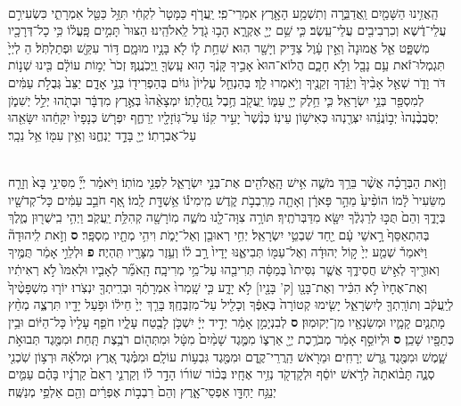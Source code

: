 \documentclass[twoside, openany, parskip=half, 11pt]{book}
\begin{document}
\begin{footnotesize}
\begin{multicols}{2}
\\
 		הַֽאֲזִ֥ינוּ הַשָּׁמַ֖יִם וַֽאֲדַבֵּ֑רָה 		וְתִשְׁמַ֥ע הָאָ֖רֶץ אִמְרֵי־פִֽי׃ 
			יַֽעֲרֹ֤ף כַּמָּטָר֙ לִקְחִ֔י 			תִּזַּ֥ל כַּטַּ֖ל אִמְרָתִ֑י 
			כִּשְׂעִירִ֣ם עֲלֵי־דֶ֔שֶׁא 			וְכִרְבִיבִ֖ים עֲלֵי־עֵֽשֶׂב׃ 
			כִּ֛י שֵׁ֥ם יְיָ֖ אֶקְרָ֑א 			הָב֥וּ גֹ֖דֶל לֵֽאלֹהֵֽינוּ׃
			 הַצּוּר֙ תָּמִ֣ים פָּֽעֳל֔וֹ 			כִּ֥י כָל־דְּרָכָ֖יו מִשְׁפָּ֑ט 
			אֵ֤ל אֱמוּנָה֙ וְאֵ֣ין עָ֔וֶל 			צַדִּ֥יק וְיָשָׁ֖ר הֽוּא׃ 
			שִׁחֵ֥ת ל֛וֹ לֹ֖א בָּנָ֣יו מוּמָ֑ם 		דּ֥וֹר עִקֵּ֖שׁ וּפְתַלְתֹּֽל׃ 
			הַ לְיְיָ֙ תִּגְמְלוּ־זֹ֔את 		עַ֥ם נָבָ֖ל וְלֹ֣א חָכָ֑ם 
			הֲלוֹא־הוּא֙ אָבִ֣יךָ קָּנֶ֔ךָ 		ה֥וּא עָֽשְׂךָ֖ וַֽיְכֹֽנֲנֶֽךָ׃ 
	 		 זְכֹר֙ יְמ֣וֹת עוֹלָ֔ם 			בִּ֖ינוּ שְׁנ֣וֹת דֹּר וָדֹ֑ר 
			שְׁאַ֤ל אָבִ֨יךָ֙ וְיַגֵּ֔דְךָ 			זְקֵנֶ֖יךָ וְיֹ֥אמְרוּ לָֽךְ׃ 
			בְּהַנְחֵ֤ל עֶלְיוֹן֙ גּוֹיִ֔ם 			בְּהַפְרִיד֖וֹ בְּנֵ֣י אָדָ֑ם 
			יַצֵּב֙ גְּבֻלֹ֣ת עַמִּ֔ים 			לְמִסְפַּ֖ר בְּנֵ֥י יִשְׂרָאֵֽל׃ 
			כִּ֛י חֵ֥לֶק יְיָ֖ עַמּ֑וֹ 			יַֽעֲקֹ֖ב חֶ֥בֶל נַֽחֲלָתֽוֹ׃ 
			יִמְצָאֵ֨הוּ֙ בְּאֶ֣רֶץ מִדְבָּ֔ר 		וּבְתֹ֖הוּ יְלֵ֣ל יְשִׁמֹ֑ן 
			יְסֹֽבֲבֶ֨נְהוּ֙ יְב֣וֹנֲנֵ֔הוּ 			יִצְּרֶ֖נְהוּ כְּאִישׁ֥וֹן עֵינֽוֹ׃ 
			כְּנֶ֨שֶׁר֙ יָעִ֣יר קִנּ֔וֹ 			עַל־גּֽוֹזָלָ֖יו יְרַחֶ֑ף 
			יִפְרֹ֤שׂ כְּנָפָיו֙ יִקָּחֵ֔הוּ 			יִשָּׂאֵ֖הוּ עַל־אֶבְרָתֽוֹ׃ 
			יְיָ֖ בָּדָ֣ד יַנְחֶ֑נּוּ 			וְאֵ֥ין עִמּ֖וֹ אֵ֥ל נֵכָֽר׃
			
\\
וְזֹ֣את הַבְּרָכָ֗ה אֲשֶׁ֨ר בֵּרַ֥ךְ מֹשֶׁ֛ה אִ֥ישׁ הָֽאֱלֹהִ֖ים אֶת־בְּנֵ֣י יִשְׂרָאֵ֑ל לִפְנֵ֖י מוֹתֽוֹ׃ וַיֹּאמַ֗ר יְיָ֞ מִסִּינַ֥י בָּא֙ וְזָרַ֤ח מִשֵּׂעִיר֙ לָ֔מוֹ הוֹפִ֨יעַ֙ מֵהַ֣ר פָּארָ֔ן וְאָתָ֖ה מֵרִֽבְבֹ֣ת קֹ֑דֶשׁ מִֽימִינ֕וֹ אֵ֥שְׁדָּ֖ת לָֽמוֹ׃ אַ֚ף חֹבֵ֣ב עַמִּ֔ים כָּל־קְדֹשָׁ֖יו בְּיָדֶ֑ךָ וְהֵם֙ תֻּכּ֣וּ לְרַגְלֶ֔ךָ יִשָּׂ֖א מִדַּבְּרֹתֶֽיךָ׃ תּוֹרָ֥ה צִוָּה־לָ֖נוּ מֹשֶׁ֑ה מֽוֹרָשָׁ֖ה קְהִלַּ֥ת יַֽעֲקֹֽב׃ וַיְהִ֥י בִֽישֻׁר֖וּן מֶ֑לֶךְ בְּהִתְאַסֵּף֙ רָ֣אשֵׁי עָ֔ם יַ֖חַד שִׁבְטֵ֥י יִשְׂרָאֵֽל׃ יְחִ֥י רְאוּבֵ֖ן וְאַל־יָמֹ֑ת וִיהִ֥י מְתָ֖יו מִסְפָּֽר׃ \textbf{ס} וְזֹ֣את לִֽיהוּדָה֘ וַיֹּאמַר֒ שְׁמַ֤ע יְיָ֙ ק֣וֹל יְהוּדָ֔ה וְאֶל־עַמּ֖וֹ תְּבִיאֶ֑נּוּ יָדָיו֙ רָ֣ב ל֔וֹ וְעֵ֥זֶר מִצָּרָ֖יו תִּֽהְיֶה׃ \textbf{פ} 
וּלְלֵוִ֣י אָמַ֔ר תֻּמֶּ֥יךָ וְאוּרֶ֖יךָ לְאִ֣ישׁ חֲסִידֶ֑ךָ אֲשֶׁ֤ר נִסִּיתוֹ֙ בְּמַסָּ֔ה תְּרִיבֵ֖הוּ עַל־מֵ֥י מְרִיבָֽה׃ הָֽאֹמֵ֞ר לְאָבִ֤יו וּלְאִמּוֹ֙ לֹ֣א רְאִיתִ֔יו וְאֶת־אֶחָיו֙ לֹ֣א הִכִּ֔יר וְאֶת־בָּנָ֖ו [ק' בָּנָ֖יו] לֹ֣א יָדָ֑ע כִּ֤י שָֽׁמְרוּ֙ אִמְרָתֶ֔ךָ וּבְרִֽיתְךָ֖ יִנְצֹֽרוּ׃ יוֹר֤וּ מִשְׁפָּטֶ֨יךָ֙ לְיַֽעֲקֹ֔ב וְתוֹרָֽתְךָ֖ לְיִשְׂרָאֵ֑ל יָשִׂ֤ימוּ קְטוֹרָה֙ בְּאַפֶּ֔ךָ וְכָלִ֖יל עַל־מִזְבְּחֶֽךָ׃ בָּרֵ֤ךְ יְיָ֙ חֵיל֔וֹ וּפֹ֥עַל יָדָ֖יו תִּרְצֶ֑ה מְחַ֨ץ מָתְנַ֧יִם קָמָ֛יו וּמְשַׂנְאָ֖יו מִן־יְקוּמֽוּן׃ \textbf{ס} לְבִנְיָמִ֣ן אָמַ֔ר יְדִ֣יד יְיָ֔ יִשְׁכֹּ֥ן לָבֶ֖טַח עָלָ֑יו חֹפֵ֤ף עָלָיו֙ כָּל־הַיּ֔וֹם וּבֵ֥ין כְּתֵפָ֖יו שָׁכֵֽן׃ \textbf{ס} 
 וּלְיוֹסֵ֣ף אָמַ֔ר מְבֹרֶ֥כֶת יְיָ֖ אַרְצ֑וֹ מִמֶּ֤גֶד שָׁמַ֨יִם֙ מִטָּ֔ל וּמִתְּה֖וֹם רֹבֶ֥צֶת תָּֽחַת׃ וּמִמֶּ֖גֶד תְּבוּאֹ֣ת שָׁ֑מֶשׁ וּמִמֶּ֖גֶד גֶּ֥רֶשׁ יְרָחִֽים׃ וּמֵרֹ֖אשׁ הַֽרֲרֵי־קֶ֑דֶם וּמִמֶּ֖גֶד גִּבְע֥וֹת עוֹלָֽם׃ וּמִמֶּ֗גֶד אֶ֚רֶץ וּמְלֹאָ֔הּ וּרְצ֥וֹן שֹֽׁכְנִ֖י סְנֶ֑ה תָּב֨וֹאתָה֙ לְרֹ֣אשׁ יוֹסֵ֔ף וּלְקָדְקֹ֖ד נְזִ֥יר אֶחָֽיו׃ בְּכ֨וֹר שׁוֹר֜וֹ הָדָ֣ר ל֗וֹ וְקַרְנֵ֤י רְאֵם֙ קַרְנָ֔יו בָּהֶ֗ם עַמִּ֛ים יְנַגַּ֥ח יַחְדָּ֖ו אַפְסֵי־אָ֑רֶץ וְהֵם֙ רִבְב֣וֹת אֶפְרַ֔יִם וְהֵ֖ם אַלְפֵ֥י מְנַשֶּֽׁה׃


\end{multicols}
\end{footnotesize}
\end{document}
